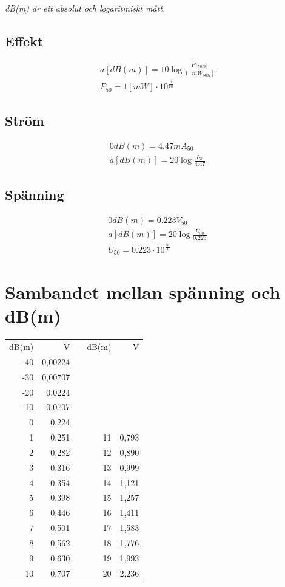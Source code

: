 \emph{dB(m) är ett absolut och logaritmiskt mått.}

\subsection{Effekt}

\begin{gather*}
	a [dB(m)] = 10 \log\frac{P_{[50 \Omega]}}{1[mW_{50 \Omega}]} \\
	P_{50} = 1 [mW] \cdot 10^{\frac{a}{10}}
\end{gather*}

\subsection{Ström}

\begin{gather*}
	0 dB(m) = 4.47 mA_{50} \\
	a [dB(m)] = 20 \log\frac{I_{50}}{4.47}
\end{gather*}

\subsection{Spänning}

\begin{gather*}
	0 dB(m) = 0.223 V_{50} \\
	a [dB(m)] = 20 \log\frac{U_{50}}{0.223} \\
	U_{50} = 0.223 \cdot 10^{\frac{a}{20}}
\end{gather*}

\section[Sambandet spänning och dB(m)]{Sambandet mellan spänning och dB(m)}
\begin{tabular}{r|rp{1cm}r|r}
	dB(m) &       V &  & dB(m) &     V \\ \cline{1-2}\cline{4-5}
	-40   & 0,00224 &  &       &  \\
	-30   & 0,00707 &  &       &  \\
	-20   &  0,0224 &  &       &  \\
	-10   &  0,0707 &  &       &  \\
	0     &   0,224 &  &       &  \\
	1     &   0,251 &  & 11    & 0,793 \\
	2     &   0,282 &  & 12    & 0,890 \\
	3     &   0,316 &  & 13    & 0,999 \\
	4     &   0,354 &  & 14    & 1,121 \\
	5     &   0,398 &  & 15    & 1,257 \\
	6     &   0,446 &  & 16    & 1,411 \\
	7     &   0,501 &  & 17    & 1,583 \\
	8     &   0,562 &  & 18    & 1,776 \\
	9     &   0,630 &  & 19    & 1,993 \\
	10    &   0,707 &  & 20    & 2,236
\end{tabular}


